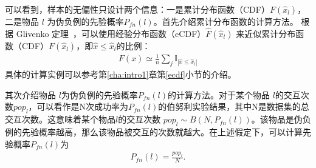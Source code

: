 可以看到，样本的无偏性只设计两个信息：一是累计分布函数（CDF）$F(\hat{x}_l)$，二是物品 $l$ 为伪负例的先验概率$P_{fn}(l)$。首先介绍累计分布函数的计算方法。
根据 Glivenko 定理~\cite{glivenko:1933}，可以使用经验分布函数（eCDF）$\hat F(\hat{x}_l)$ 来近似累计分布函数（CDF）$F(\hat{x}_l)$，即$\hat{x} \leq \hat{x}_l$的比例：
\begin{eqnarray}\label{Eq:CDF}
 F(x) \simeq \frac{1}{n}\sum_j \mathbb I_{|\hat{x} \leq \hat{x}_l|}
\end{eqnarray}
具体的计算实例可以参考第\ref{cha:intro1}章第\ref{ecdf}小节的介绍。

其次介绍物品 $l$为伪负例的先验概率$P_{fn}(l)$的计算方法。对于某个物品 $l$的交互次数$pop_l$，可以看作是N次成功率为$P_{fn}(l)$的伯努利实验结果，其中N是数据集的总交互次数。这意味着某个物品$l$的交互次数 $pop_l \sim B(N, P_{fn}(l))$。该物品是伪负例的先验概率越高，那么该物品被交互的次数就越大。在上述假定下，可以计算先验概率$P_{fn}(l)$为
\begin{eqnarray}\label{Eq:Prior}	
	P_{fn}(l) = \frac{pop_l}{N}.
\end{eqnarray}

